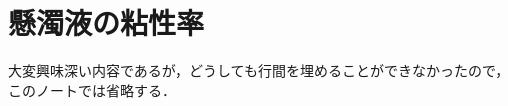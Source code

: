 \section{懸濁液の粘性率}

\begin{details}
大変興味深い内容であるが，どうしても行間を埋めることができなかったので，このノートでは省略する．
\end{details}

\BackToTheToc